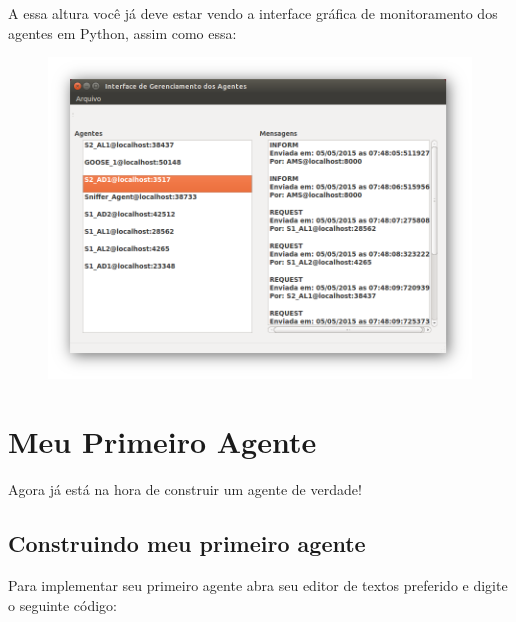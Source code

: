 \documentclass[letterpaper,10pt,brazil]{sphinxmanual}
\begin{document}
A essa altura você já deve estar vendo a interface gráfica de monitoramento dos agentes em Python, assim como essa:
\begin{figure}[htbp]
\centering

\includegraphics[width=5.0in]{InterfaceSniffer.png}
\end{figure}


\section{Meu Primeiro Agente}
\label{user/meu-primeiro-agente:meu-primeiro-agente}\label{user/meu-primeiro-agente::doc}
Agora já está na hora de construir um agente de verdade!


\subsection{Construindo meu primeiro agente}
\label{user/meu-primeiro-agente:construindo-meu-primeiro-agente}
Para implementar seu primeiro agente abra seu editor de textos preferido e digite o seguinte código:
\end{document}
